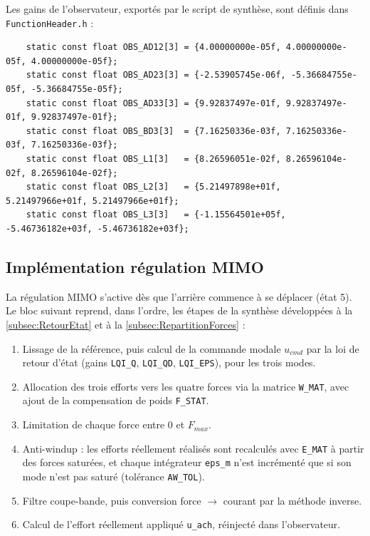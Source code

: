 Les gains de l'observateur, exportés par le script de synthèse, sont définis dans \texttt{FunctionHeader.h} :

\begin{verbatim}
    static const float OBS_AD12[3] = {4.00000000e-05f, 4.00000000e-05f, 4.00000000e-05f};
    static const float OBS_AD23[3] = {-2.53905745e-06f, -5.36684755e-05f, -5.36684755e-05f};
    static const float OBS_AD33[3] = {9.92837497e-01f, 9.92837497e-01f, 9.92837497e-01f};
    static const float OBS_BD3[3]  = {7.16250336e-03f, 7.16250336e-03f, 7.16250336e-03f};
    static const float OBS_L1[3]   = {8.26596051e-02f, 8.26596104e-02f, 8.26596104e-02f};
    static const float OBS_L2[3]   = {5.21497898e+01f, 5.21497966e+01f, 5.21497966e+01f};
    static const float OBS_L3[3]   = {-1.15564501e+05f, -5.46736182e+03f, -5.46736182e+03f};
\end{verbatim}


\subsection{Implémentation régulation MIMO}
La régulation MIMO s'active dès que l'arrière commence à se déplacer (état 5). Le bloc suivant reprend, dans l'ordre, les étapes de la synthèse développées à la \autoref{subsec:RetourEtat} et à la \autoref{subsec:RepartitionForces} :

\begin{enumerate}
    \item Lissage de la référence, puis calcul de la commande modale $u_{cmd}$ par la loi de retour d'état (gains \texttt{LQI\_Q}, \texttt{LQI\_QD}, \texttt{LQI\_EPS}), pour les trois modes.
    \item Allocation des trois efforts vers les quatre forces via la matrice \texttt{W\_MAT}, avec ajout de la compensation de poids \texttt{F\_STAT}.
    \item Limitation de chaque force entre $0$ et $F_{max}$.
    \item Anti-windup : les efforts réellement réalisés sont recalculés avec \texttt{E\_MAT} à partir des forces saturées, et chaque intégrateur \texttt{eps\_m} n'est incrémenté que si son mode n'est pas saturé (tolérance \texttt{AW\_TOL}).
    \item Filtre coupe-bande, puis conversion force $\to$ courant par la méthode inverse.
    \item Calcul de l'effort réellement appliqué \texttt{u\_ach}, réinjecté dans l'observateur.
\end{enumerate}

